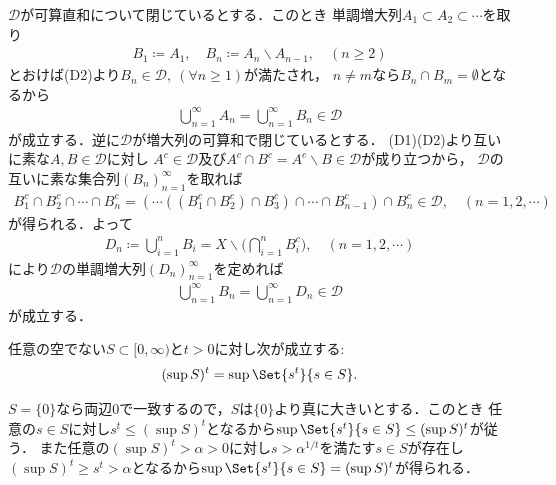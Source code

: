 	\begin{prf}
		$\mathscr{D}$が可算直和について閉じているとする．このとき
		単調増大列$A_1 \subset A_2 \subset \cdots$を取り
		\begin{align}
			B_1 \coloneqq A_1,
			\quad B_n \coloneqq A_n \backslash A_{n-1},
			\quad (n \geq 2)
		\end{align}
		とおけば(D2)より$B_n \in \mathscr{D},\ (\forall n \geq 1)$が満たされ，
		$n \neq m$なら$B_n \cap B_m = \emptyset$となるから
		\begin{align}
			\bigcup_{n=1}^{\infty} A_n = \bigcup_{n=1}^{\infty} B_n \in \mathscr{D} 
		\end{align}
		が成立する．逆に$\mathscr{D}$が増大列の可算和で閉じているとする．
		(D1)(D2)より互いに素な$A,B \in \mathscr{D}$に対し
		$A^c \in \mathscr{D}$及び$A^c \cap B^c = A^c \backslash B\in \mathscr{D}$が成り立つから，
		$\mathscr{D}$の互いに素な集合列$(B_n)_{n=1}^{\infty}$を取れば
		\begin{align}
			B_1^c \cap B_2^c \cap \cdots \cap B_n^c
			= \left( \cdots \left( \left( B_1^c \cap B_2^c \right) \cap B_3^c \right) \cap \cdots \cap B_{n-1}^c \right) \cap B_n^c
			\in \mathscr{D},
			\quad (n=1,2,\cdots)
		\end{align}
		が得られる．よって
		\begin{align}
			D_n \coloneqq \bigcup_{i=1}^n B_i = X \backslash \Biggl( \bigcap_{i=1}^n B_i^c \Biggr),
			\quad (n=1,2,\cdots)
		\end{align}
		により$\mathscr{D}$の単調増大列$(D_n)_{n=1}^{\infty}$を定めれば
		\begin{align}
			\bigcup_{n=1}^{\infty} B_n = \bigcup_{n=1}^{\infty} D_n \in \mathscr{D}
		\end{align}
		が成立する．
		\QED
	\end{prf}

	\begin{screen}
		\begin{thm}[上限の冪と冪の上限]\label{thm:exponentiation_of_supremum_supremum_of_exponentiation}
			任意の空でない$S \subset [0,\infty)$と$t > 0$に対し次が成立する:
			\begin{align}
				(\sup{}{S})^t = \sup{}{\Set{s^t}{s \in S}}.
			\end{align}
		\end{thm}
	\end{screen}
	
	\begin{prf}
		$S=\{0\}$なら両辺0で一致するので，$S$は$\{0\}$より真に大きいとする．このとき
		任意の$s \in S$に対し$s^t \leq (\sup{}{S})^t$となるから$\sup{}{\Set{s^t}{s \in S}} \leq (\sup{}{S})^t$が従う．
		また任意の$(\sup{}{S})^t > \alpha > 0$に対し$s > \alpha^{1/t}$を満たす$s \in S$が存在し
		$(\sup{}{S})^t \geq s^t > \alpha$となるから$\sup{}{\Set{s^t}{s \in S}} = (\sup{}{S})^t$が得られる．
		\QED
	\end{prf}
